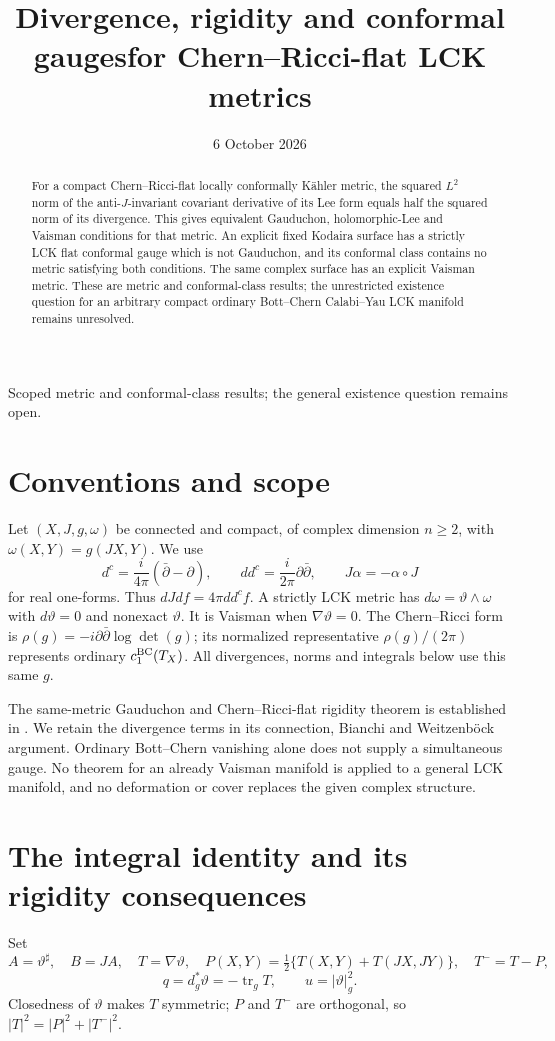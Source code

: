 \documentclass[11pt]{article}
\title{Divergence, rigidity and conformal gauges\newline for Chern--Ricci-flat LCK metrics}
\author{}
\date{6 October 2026}
\newcommand{\ddc}{dd^c}
\newcommand{\tr}{\operatorname{tr}}
\begin{document}
\maketitle
\begin{center}\small Scoped metric and conformal-class results; the general existence question remains open.\end{center}
\begin{abstract}
For a compact Chern--Ricci-flat locally conformally K\"ahler metric,
the squared $L^2$ norm of the anti-$J$-invariant covariant derivative
of its Lee form equals half the squared norm of its divergence.
This gives equivalent Gauduchon, holomorphic-Lee and Vaisman conditions
for that metric. An explicit fixed Kodaira surface has a strictly LCK
flat conformal gauge which is not Gauduchon, and its conformal class
contains no metric satisfying both conditions. The same complex surface
has an explicit Vaisman metric. These are metric and conformal-class
results; the unrestricted existence question for an arbitrary compact
ordinary Bott--Chern Calabi--Yau LCK manifold remains unresolved.
\end{abstract}

\section{Conventions and scope}
Let $(X,J,g,\omega)$ be connected and compact, of complex dimension
$n\geq2$, with $\omega(X,Y)=g(JX,Y)$. We use
\[
 d^c=\frac{i}{4\pi}(\bar\partial-\partial),
 \qquad \ddc=\frac{i}{2\pi}\partial\bar\partial,
 \qquad J\alpha=-\alpha\circ J
\]
for real one-forms. Thus $dJdf=4\pi\ddc f$. A strictly LCK metric has
$d\omega=\vartheta\wedge\omega$ with $d\vartheta=0$ and nonexact
$\vartheta$. It is Vaisman when $\nabla\vartheta=0$. The Chern--Ricci
form is $\rho(g)=-i\partial\bar\partial\log\det(g)$; its normalized
representative $\rho(g)/(2\pi)$ represents ordinary $c_1^{\rm BC}(T_X)$.
All divergences, norms and integrals below use this same $g$.

The same-metric Gauduchon and Chern--Ricci-flat rigidity theorem is
established in \cite[Theorem A]{BO}. We retain the divergence terms
in its connection, Bianchi and Weitzenb\"ock argument. Ordinary
Bott--Chern vanishing alone does not supply a simultaneous gauge.
No theorem for an already Vaisman manifold is applied to a general
LCK manifold, and no deformation or cover replaces the given complex
structure.

\section{The integral identity and its rigidity consequences}
Set
\[
 A=\vartheta^\sharp,\quad B=JA,\quad T=\nabla\vartheta,\quad
 P(X,Y)=\tfrac12\{T(X,Y)+T(JX,JY)\},\quad T^-=T-P,
\]
\[
 q=d_g^*\vartheta=-\tr_gT,\qquad u=|\vartheta|_g^2.
\]
Closedness of $\vartheta$ makes $T$ symmetric; $P$ and $T^-$ are
orthogonal, so $|T|^2=|P|^2+|T^-|^2$.
\end{document}
